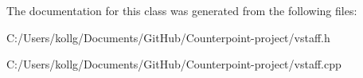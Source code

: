 The documentation for this class was generated from the following files\+:\begin{DoxyCompactItemize}
\item 
C\+:/\+Users/kollg/\+Documents/\+Git\+Hub/\+Counterpoint-\/project/vstaff.\+h\item 
C\+:/\+Users/kollg/\+Documents/\+Git\+Hub/\+Counterpoint-\/project/vstaff.\+cpp\end{DoxyCompactItemize}
